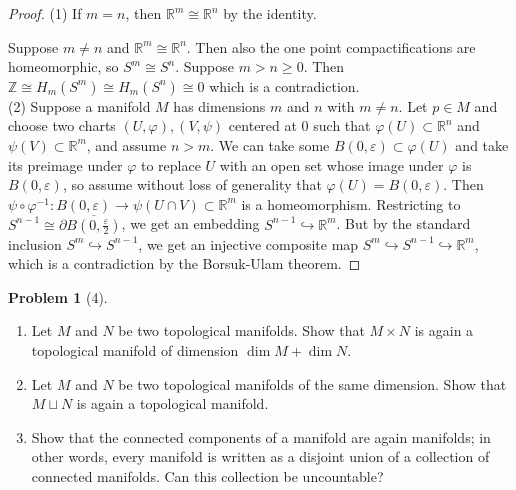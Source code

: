 \documentclass[reqno]{amsart}
\theoremstyle{definition}
\newtheorem{problem}[theorem]{Problem}
\theoremstyle{remark}
\begin{document}
\begin{proof}
    (1) 
    If $m = n$, then $\mathbb{R}^{m} \cong \mathbb{R}^{n}$ 
    by the identity.

    Suppose $m\neq n$ and $\mathbb{R}^{m} \cong
     \mathbb{R}^{n}$. Then also
     the one point compactifications are homeomorphic, so
     $S^{m} \cong S^{n}$.
     Suppose $m>n\ge 0$. Then
     $ \mathbb{Z} \cong H_m \left( S^{m} \right) 
     \cong H_m \left( S^{n} \right) 
     \cong 0$ which is a contradiction.\\
     \linebreak
     (2) Suppose a manifold  $M$ has dimensions
     $m$ and $n$ with $m\neq n$.
     Let $p \in M$ and choose
     two charts $\left( U,\varphi  \right) ,
     \left( V, \psi  \right) $ centered at
     $0$ such that
     $\varphi (U) \subset \mathbb{R}^{n}$ 
     and $\psi (V) \subset \mathbb{R}^{m}$,
     and assume $n > m$. We can take some
     $B\left( 0,\varepsilon \right) 
     \subset \varphi (U)$ and take its preimage under
     $\varphi $ to replace $U$ with an open set
     whose image under $\varphi $ is
     $B\left( 0,\varepsilon \right) $, so assume without
     loss of generality that
     $\varphi (U) = B\left( 0,\varepsilon \right) $.
     Then $\psi \circ \varphi^{-1} \colon
     B\left( 0,\varepsilon \right) \to 
     \psi \left( U \cap V \right) \subset 
     \mathbb{R}^{m}$ is a homeomorphism.
     Restricting to 
     $S^{n-1} \cong
     \partial \overline{B\left( 0, \frac{\varepsilon}{2}
     \right) }$, we get an embedding
     $S^{n-1} \hookrightarrow \mathbb{R}^{m}$.
     But by the standard inclusion
     $S^{m} \hookrightarrow S^{n-1}$, we get
     an injective composite map
     $S^{m} \hookrightarrow S^{n-1} \hookrightarrow
     \mathbb{R}^{m}$, which is a contradiction
     by the Borsuk-Ulam theorem.
\end{proof}

\begin{problem}[4]
    \begin{enumerate}
        \item Let $M$ and $N$ be two topological
            manifolds. Show that
            $M \times N$ is again a topological manifold
            of dimension $\dim M + \dim N$.
        \item Let $M$ and $N$ be two topological
            manifolds of the same dimension. Show that
            $M \sqcup N$  is again a topological
            manifold.
        \item Show that the connected components of a
            manifold are again manifolds; in other
            words, every manifold is written as a disjoint
            union of a collection of connected manifolds.
            Can this collection be uncountable?
    \end{enumerate}
\end{problem}
\end{document}
